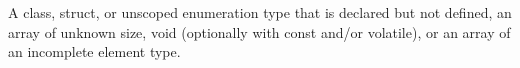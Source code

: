 



A class, struct, or unscoped enumeration type that is declared but not defined, an array of unknown size, void (optionally with const and/or volatile), or an array of an incomplete element type.
